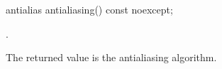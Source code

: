 %
\begin{itemdecl}
antialias antialiasing() const noexcept;
\end{itemdecl}
\begin{itemdescr}
\pnum
\returns
{}.

\pnum
\remarks
The returned value is the antialiasing algorithm.
\end{itemdescr}
